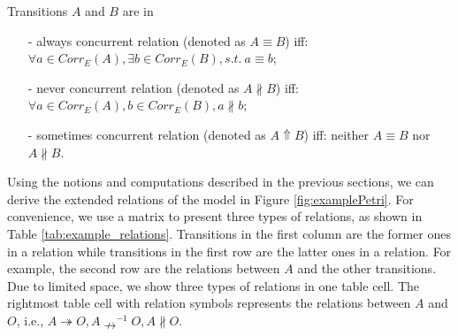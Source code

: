 \documentclass{llncs}
\begin{document}
\begin{definition}\label{def:concurrentRelations}
Transitions $A$ and $B$ are in
	\begin{itemize}
		\item[-] always concurrent relation (denoted as $A\equiv B$) iff: $\forall a\in Corr_{E}(A),\exists b\in Corr_{E}(B),s.t.~a\equiv b$;
		\item[-] never concurrent relation (denoted as $A\nparallel B$) iff: $\forall a\in Corr_{E}(A),b\in Corr_{E}(B),a\nparallel b$;
		\item[-] sometimes concurrent relation (denoted as $A\Uparrow B$) iff: neither $A\equiv B$ nor $A\nparallel B$.
	\end{itemize}
\end{definition}

\begin{example}\label{ex:examplePetriRelations}
Using the notions and computations described in the previous sections, we can derive the extended relations of the model in Figure \ref{fig:examplePetri}. For convenience, we use a matrix to present three types of relations, as shown in Table \ref{tab:example_relations}. Transitions in the first column are the former ones in a relation while transitions in the first row are the latter ones in a relation. For example, the second row are the relations between $A$ and the other transitions. Due to limited space, we show three types of relations in one table cell. The rightmost table cell with relation symbols represents the relations between $A$ and $O$, i.e., $A\twoheadrightarrow O,A\nrightarrow^{-1}O,A\nparallel O$.
\end{example}
\end{document}
